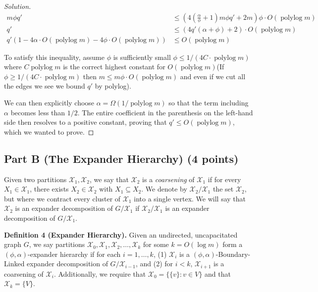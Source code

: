 \documentclass[a4paper,11pt]{article}
\DeclareMathOperator{\polylog}{polylog}
\newenvironment{solution}
  {\begin{proof}[Solution]}
  {\end{proof}}
\begin{document}
\begin{solution}
\begin{align*}
    m \phi q' &\leq \left( 4 \left(\frac{\alpha}{\phi} + 1 \right)m \phi q' + 2m \right) \phi \cdot O(\polylog m) \\
    q' &\leq \left( 4q'( \alpha +\phi ) + 2 \right) \cdot O(\polylog m) \\
    q' \left( 1 - 4\alpha \cdot O(\polylog m) -4\phi \cdot O(\polylog m) \right) &\leq O(\polylog m) 
\end{align*}

To satisfy this inequality, assume $\phi$ is sufficiently small $\phi \leq 1/(4C \cdot \polylog m)$ where $C \polylog m$ is the correct highest constant for $O(\polylog m)$(If $\phi \geq 1/(4C \cdot \polylog m)$ then $m \leq m \phi \cdot O(\polylog m)$ and even if we cut all the edges we see we bound $q'$ by polylog). 

We can then explicitly choose $\alpha = \Omega(1 / \polylog m)$ so that the term including $\alpha$ becomes less than $1/2$. The entire coefficient in the parenthesis on the left-hand side then resolves to a positive constant, proving that $q' \leq O(\polylog m)$, which we wanted to prove.

\end{solution}






\subsection*{Part B (The Expander Hierarchy) (4 points)}
Given two partitions \(\mathcal{X}_1, \mathcal{X}_2\), we say that \(\mathcal{X}_2\) is a \emph{coarsening} of \(\mathcal{X}_1\) if for every \(X_1 \in \mathcal{X}_1\), there exists \(X_2 \in \mathcal{X}_2\) with \(X_1 \subseteq X_2\). We denote by \(\mathcal{X}_2 / \mathcal{X}_1\) the set \(\mathcal{X}_2\), but where we contract every cluster of \(\mathcal{X}_1\) into a single vertex. We will say that \(\mathcal{X}_2\) is an expander decomposition of \(G / \mathcal{X}_1\) if \(\mathcal{X}_2 / \mathcal{X}_1\) is an expander decomposition of \(G / \mathcal{X}_1\).

\textbf{Definition 4 (Expander Hierarchy).} Given an undirected, uncapacitated graph \(G\), we say partitions \(\mathcal{X}_0, \mathcal{X}_1, \mathcal{X}_2, \ldots , \mathcal{X}_k\) for some \(k = O(\log m)\) form a \((\phi, \alpha)\)-expander hierarchy if for each \(i = 1, \ldots , k\), (1) \(\mathcal{X}_i\) is a \((\phi, \alpha)\)-Boundary-Linked expander decomposition of \(G / \mathcal{X}_{i-1}\), and (2) for \(i < k\), \(\mathcal{X}_{i+1}\) is a coarsening of \(\mathcal{X}_i\). Additionally, we require that \(\mathcal{X}_0 = \{\{v\} : v \in V\}\) and that \(\mathcal{X}_k = \{V\}\).
\end{document}
